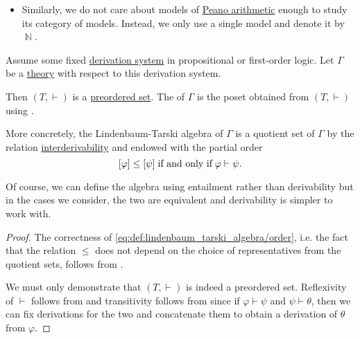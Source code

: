 \begin{example}
\begin{itemize}
    \item Similarly, we do not care about models of \hyperref[def:peano_arithmetic]{Peano arithmetic} enough to study its category of models. Instead, we only use a single model and denote it by \( \BbbN \).
  \end{itemize}
\end{example}

\begin{definition}\label{def:lindenbaum_tarski_algebra}
  Assume some fixed \hyperref[def:first_order_derivation_ystem]{derivation system} in propositional or first-order logic. Let \( \Gamma \) be a \hyperref[def:first_order_theory]{theory} with respect to this derivation system.

  Then \( (T, \vdash) \) is a \hyperref[def:preordered_set]{preordered set}. The  of \( \Gamma \) is the poset obtained from \( (T, \vdash) \) using .

  More concretely, the Lindenbaum-Tarski algebra of \( \Gamma \) is a quotient set of \( \Gamma \) by the relation \hyperref[def:first_order_derivability]{interderivability} and endowed with the partial order
  \begin{equation}\label{eq:def:lindenbaum_tarski_algebra/order}
    [\varphi] \leq [\psi] \thickspace \text{if and only if} \thickspace \varphi \vdash \psi.
  \end{equation}

  Of course, we can define the algebra using entailment rather than derivability but in the cases we consider, the two are equivalent and derivability is simpler to work with.
\end{definition}
\begin{proof}
  The correctness of \eqref{eq:def:lindenbaum_tarski_algebra/order}, i.e. the fact that the relation \( \leq \) does not depend on the choice of representatives from the quotient sets, follows from .

  We must only demonstrate that \( (T, \vdash) \) is indeed a preordered set. Reflexivity of \( \vdash \) follows from  and transitivity follows from  since if \( \varphi \vdash \psi \) and \( \psi \vdash \theta \), then we can fix derivations for the two and concatenate them to obtain a derivation of \( \theta \) from \( \varphi \).
\end{proof}

